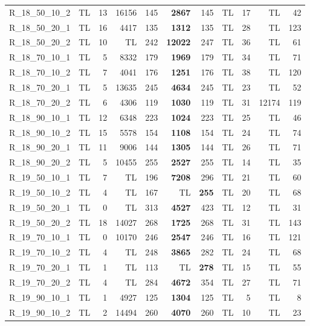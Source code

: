 \documentclass{article}
\begin{document}
\begin{longtable}{lrrrrrrrrrr}
R\_18\_50\_10\_2 & TL & 13 & 16156 & 145 & \textbf{2867} & 145 & TL & 17 & TL & 42 \\
R\_18\_50\_20\_1 & TL & 16 & 4417 & 135 & \textbf{1312} & 135 & TL & 28 & TL & 123 \\
R\_18\_50\_20\_2 & TL & 10 & TL & 242 & \textbf{12022} & 247 & TL & 36 & TL & 61 \\
R\_18\_70\_10\_1 & TL & 5 & 8332 & 179 & \textbf{1969} & 179 & TL & 34 & TL & 71 \\
R\_18\_70\_10\_2 & TL & 7 & 4041 & 176 & \textbf{1251} & 176 & TL & 38 & TL & 120 \\
R\_18\_70\_20\_1 & TL & 5 & 13635 & 245 & \textbf{4634} & 245 & TL & 23 & TL & 52 \\
R\_18\_70\_20\_2 & TL & 6 & 4306 & 119 & \textbf{1030} & 119 & TL & 31 & 12174 & 119 \\
R\_18\_90\_10\_1 & TL & 12 & 6348 & 223 & \textbf{1024} & 223 & TL & 25 & TL & 46 \\
R\_18\_90\_10\_2 & TL & 15 & 5578 & 154 & \textbf{1108} & 154 & TL & 24 & TL & 74 \\
R\_18\_90\_20\_1 & TL & 11 & 9006 & 144 & \textbf{1305} & 144 & TL & 26 & TL & 71 \\
R\_18\_90\_20\_2 & TL & 5 & 10455 & 255 & \textbf{2527} & 255 & TL & 14 & TL & 35 \\
R\_19\_50\_10\_1 & TL & 7 & TL & 196 & \textbf{7208} & 296 & TL & 21 & TL & 60 \\
R\_19\_50\_10\_2 & TL & 4 & TL & 167 & TL & \textbf{255} & TL & 20 & TL & 68 \\
R\_19\_50\_20\_1 & TL & 0 & TL & 313 & \textbf{4527} & 423 & TL & 12 & TL & 31 \\
R\_19\_50\_20\_2 & TL & 18 & 14027 & 268 & \textbf{1725} & 268 & TL & 31 & TL & 143 \\
R\_19\_70\_10\_1 & TL & 0 & 10170 & 246 & \textbf{2547} & 246 & TL & 16 & TL & 121 \\
R\_19\_70\_10\_2 & TL & 4 & TL & 248 & \textbf{3865} & 282 & TL & 24 & TL & 68 \\
R\_19\_70\_20\_1 & TL & 1 & TL & 113 & TL & \textbf{278} & TL & 15 & TL & 55 \\
R\_19\_70\_20\_2 & TL & 4 & TL & 284 & \textbf{4672} & 354 & TL & 27 & TL & 71 \\
R\_19\_90\_10\_1 & TL & 1 & 4927 & 125 & \textbf{1304} & 125 & TL & 5 & TL & 8 \\
R\_19\_90\_10\_2 & TL & 2 & 14494 & 260 & \textbf{4070} & 260 & TL & 10 & TL & 23 \\

\end{longtable}
\end{document}
